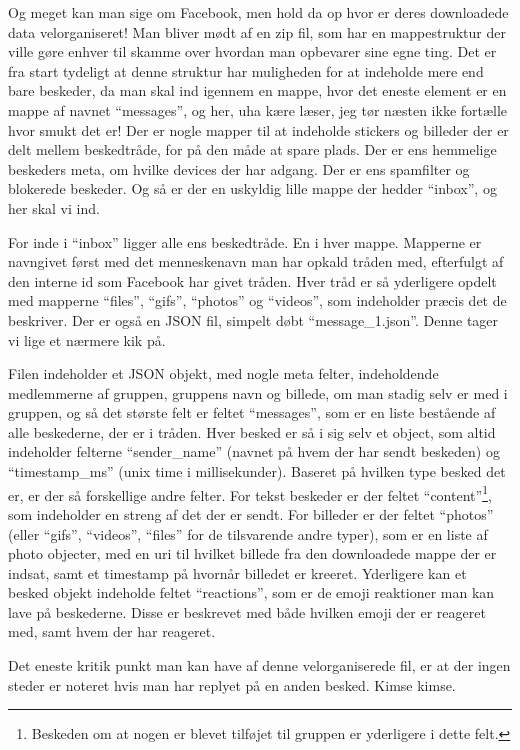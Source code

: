 \begin{article}
Og meget kan man sige om Facebook, men hold da op hvor er deres downloadede data velorganiseret! Man bliver mødt af en zip fil, som har en mappestruktur der ville gøre enhver til skamme over hvordan man opbevarer sine egne ting. Det er fra start tydeligt at denne struktur har muligheden for at indeholde mere end bare beskeder, da man skal ind igennem en mappe, hvor det eneste element er en mappe af navnet ``messages'', og her, uha kære læser, jeg tør næsten ikke fortælle hvor smukt det er!
Der er nogle mapper til at indeholde stickers og billeder der er delt mellem beskedtråde, for på den måde at spare plads. Der er ens hemmelige beskeders meta, om hvilke devices der har adgang. Der er ens spamfilter og blokerede beskeder. Og så er der en uskyldig lille mappe der hedder ``inbox'', og her skal vi ind.

For inde i ``inbox'' ligger alle ens beskedtråde. En i hver mappe. Mapperne er navngivet først med det menneskenavn man har opkald tråden med, efterfulgt af den interne id som Facebook har givet tråden. Hver tråd er så yderligere opdelt med mapperne ``files'', ``gifs'', ``photos'' og ``videos'', som indeholder præcis det de beskriver. Der er også en JSON fil, simpelt døbt ``message\_1.json''. Denne tager vi lige et nærmere kik på.

Filen indeholder et JSON objekt, med nogle meta felter, indeholdende medlemmerne af gruppen, gruppens navn og billede, om man stadig selv er med i gruppen, og så det største felt er feltet ``messages'', som er en liste bestående af alle beskederne, der er i tråden. Hver besked er så i sig selv et object, som altid indeholder felterne ``sender\_name'' (navnet på hvem der har sendt beskeden) og ``timestamp\_ms'' (unix time i millisekunder). Baseret på hvilken type besked det er, er der så forskellige andre felter. For tekst beskeder er der feltet ``content''\footnote{Beskeden om at nogen er blevet tilføjet til gruppen er yderligere i dette felt.}, som indeholder en streng af det der er sendt. For billeder er der feltet ``photos'' (eller ``gifs'', ``videos'', ``files'' for de tilsvarende andre typer), som er en liste af photo objecter, med en uri til hvilket billede fra den downloadede mappe der er indsat, samt et timestamp på hvornår billedet er kreeret.
Yderligere kan et besked objekt indeholde feltet ``reactions'', som er de emoji reaktioner man kan lave på beskederne. Disse er beskrevet med både hvilken emoji der er reageret med, samt hvem der har reageret.

Det eneste kritik punkt man kan have af denne velorganiserede fil, er at der ingen steder er noteret hvis man har replyet på en anden besked. Kimse kimse.


\end{article}
